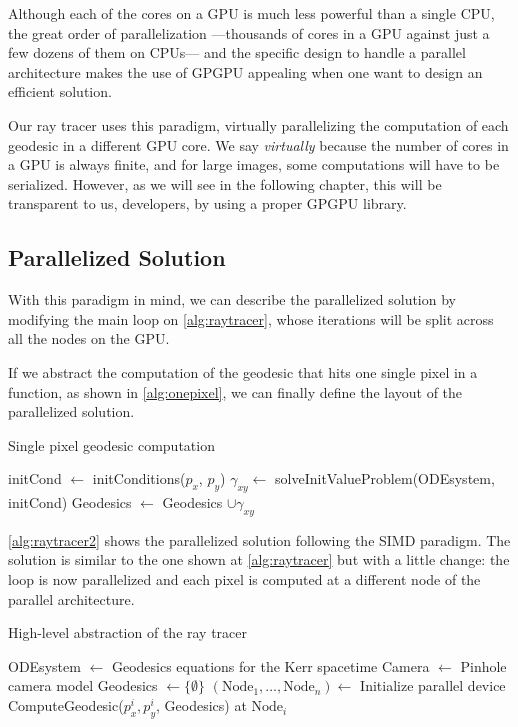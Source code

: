 Although each of the cores on a \ac{GPU} is much less powerful than a single \ac{CPU}, the great order of parallelization ---thousands of cores in a \ac{GPU} against just a few dozens of them on \acp{CPU}--- and the specific design to handle a parallel architecture makes the use of \ac{GPGPU} appealing when one want to design an efficient solution.

Our ray tracer uses this paradigm, virtually parallelizing the computation of each geodesic in a different \ac{GPU} core. We say \emph{virtually} because the number of cores in a \ac{GPU} is always finite, and for large images, some computations will have to be serialized. However, as we will see in the following chapter, this will be transparent to us, developers, by using a proper \ac{GPGPU} library.

\subsection{Parallelized Solution}

With this paradigm in mind, we can describe the parallelized solution by modifying the main loop on \autoref{alg:raytracer}, whose iterations will be split across all the nodes on the \ac{GPU}.

If we abstract the computation of the geodesic that hits one single pixel in a function, as shown in \autoref{alg:onepixel}, we can finally define the layout of the parallelized solution.

\begin{algorithm}[bth]
	\caption{Single pixel geodesic computation}
	\label{alg:onepixel}
	\begin{algorithmic}[1]
		\State initCond $\gets$ initConditions($p_x$, $p_y$)
		\State $\gamma_{xy} \gets$ solveInitValueProblem(ODEsystem, initCond)
		\State Geodesics $\gets$ Geodesics $\cup \gamma_{xy}$
		\EndFunction
	\end{algorithmic}
\end{algorithm}

\autoref{alg:raytracer2} shows the parallelized solution following the \ac{SIMD} paradigm. The solution is similar to the one shown at \autoref{alg:raytracer} but with a little change: the loop is now parallelized and each pixel is computed at a different node of the parallel architecture.

\begin{algorithm}
	\caption{High-level abstraction of the ray tracer}
	\label{alg:raytracer2}
	\begin{algorithmic}[1]
		\State ODEsystem $\gets$ Geodesics equations for the Kerr spacetime
		\State Camera $\gets$ Pinhole camera model
		\State Geodesics $\gets \{\emptyset\}$
		\State $(\textrm{Node}_1, \dots, \textrm{Node}_n) \gets$ Initialize parallel device
		\State ComputeGeodesic($p^i_x, p^i_y$, Geodesics) at $\textrm{Node}_i$
		\EndFor
		\EndFunction
	\end{algorithmic}
\end{algorithm}

